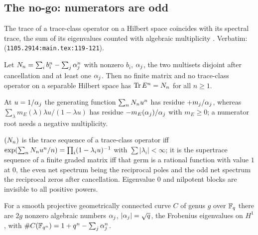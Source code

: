 \subsection{The no-go: numerators are odd}

\begin{citedfact}
\label{cit:lidskii-trace}
The trace of a trace-class operator on a Hilbert space coincides with its spectral trace,
the sum of its eigenvalues counted with algebraic multiplicity \cite{reinov2011lidskii,simon2005trace}.
Verbatim: \texttt{} (\texttt{1105.2914:main.tex:119-121}).
\end{citedfact}

\begin{theorem}
\label{thm:no-ungraded-trace}
Let $N_{n} = \sum_ib_i^n - \sum_j\alpha_{j}^n$ with nonzero $b_i$, $\alpha_{j}$, the two
multisets disjoint after cancellation and at least one $\alpha_{j}$. Then no finite matrix
and no trace-class operator on a separable Hilbert space has $\operatorname{Tr} E^n = N_{n}$ for
all $n\ge1$.
\end{theorem}

At $u = 1/\alpha_{j}$ the generating function $\sum_nN_{n}u^n$ has residue
$+m_j/\alpha_{j}$, whereas $\sum_\lambda m_E(\lambda)\lambda u/(1-\lambda u)$ has residue
$-m_E(\alpha_{j})/\alpha_{j}$ with $m_E\ge0$; a numerator root needs a negative multiplicity.

\begin{proposition}
\label{prop:trace-supertrace-criterion}
$(N_{n})$ is the trace sequence of a trace-class operator iff
$\exp(\sum_nN_{n}u^n/n) = \prod_i(1-\lambda_iu)^{-1}$ with $\sum|\lambda_i|<\infty$;
it is the supertrace sequence of a finite graded matrix iff that germ is a rational
function with value $1$ at $0$, the even net spectrum being the reciprocal poles and the
odd net spectrum the reciprocal zeros after cancellation. Eigenvalue $0$ and nilpotent
blocks are invisible to all positive powers.
\end{proposition}

\begin{assumption}
\label{asm:weil-curves}
For a smooth projective geometrically connected curve $C$ of genus $g$ over $\mathbb F_q$ there
are $2g$ nonzero algebraic numbers $\alpha_{j}$, $|\alpha_{j}| = \sqrt{q}$, the
Frobenius eigenvalues on $H^1$, with $\#C(\mathbb F_{q^{n}}) = 1 + q^n - \sum_j\alpha_{j}^n$.
\end{assumption}

